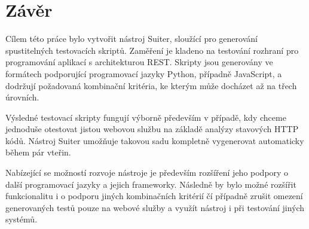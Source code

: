 

\chapter{Závěr} 
\label{ch_závěr}

Cílem této práce bylo vytvořit nástroj Suiter, sloužící pro generování spustitelných testovacích skriptů. Zaměření je kladeno na testování rozhraní pro programování aplikací s architekturou REST. Skripty jsou generovány ve formátech podporující programovací jazyky Python, případně JavaScript, a dodržují požadovaná kombinační kritéria, ke kterým může docházet až na třech úrovních.  

Výsledné testovací skripty fungují výborně především v případě, kdy chceme jednoduše otestovat jistou webovou službu na základě analýzy stavových HTTP kódů. Nástroj Suiter umožňuje takovou sadu kompletně vygenerovat automaticky během pár vteřin.  

Nabízející se možností rozvoje nástroje je především rozšíření jeho podpory o další programovací jazyky a jejich frameworky. Následně by bylo možné rozšířit funkcionalitu i o podporu jiných kombinačních kritérií čí případně zrušit omezení generovaných testů pouze na webové služby a využít nástroj i při testování jiných systémů. 
